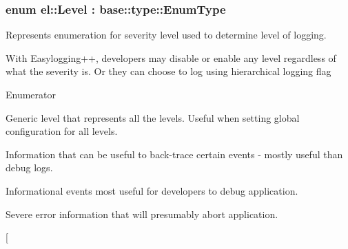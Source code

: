 \subsubsection[{\texorpdfstring{Level}{Level}}]{\setlength{\rightskip}{0pt plus 5cm}enum {\bf el\+::\+Level} \+: base\+::type\+::\+Enum\+Type\hspace{0.3cm}{\ttfamily [strong]}}\hypertarget{namespaceel_ab0ac6091262344c52dd2d3ad099e8e36}{}\label{namespaceel_ab0ac6091262344c52dd2d3ad099e8e36}


Represents enumeration for severity level used to determine level of logging. 

With Easylogging++, developers may disable or enable any level regardless of what the severity is. Or they can choose to log using hierarchical logging flag \begin{Desc}
\item[Enumerator]\par
\begin{description}
\item[{\em 
Global\hypertarget{namespaceel_ab0ac6091262344c52dd2d3ad099e8e36a4cc6684df7b4a92b1dec6fce3264fac8}{}\label{namespaceel_ab0ac6091262344c52dd2d3ad099e8e36a4cc6684df7b4a92b1dec6fce3264fac8}
}]Generic level that represents all the levels. Useful when setting global configuration for all levels. \item[{\em 
Trace\hypertarget{namespaceel_ab0ac6091262344c52dd2d3ad099e8e36add4ec0ac4e58f7c32a01244ae91150b1}{}\label{namespaceel_ab0ac6091262344c52dd2d3ad099e8e36add4ec0ac4e58f7c32a01244ae91150b1}
}]Information that can be useful to back-\/trace certain events -\/ mostly useful than debug logs. \item[{\em 
Debug\hypertarget{namespaceel_ab0ac6091262344c52dd2d3ad099e8e36aa603905470e2a5b8c13e96b579ef0dba}{}\label{namespaceel_ab0ac6091262344c52dd2d3ad099e8e36aa603905470e2a5b8c13e96b579ef0dba}
}]Informational events most useful for developers to debug application. \item[{\em 
Fatal\hypertarget{namespaceel_ab0ac6091262344c52dd2d3ad099e8e36a882384ec38ce8d9582b57e70861730e4}{}\label{namespaceel_ab0ac6091262344c52dd2d3ad099e8e36a882384ec38ce8d9582b57e70861730e4}
}]Severe error information that will presumably abort application. \item[{\em 
}
\end{description}
\end{Desc}
